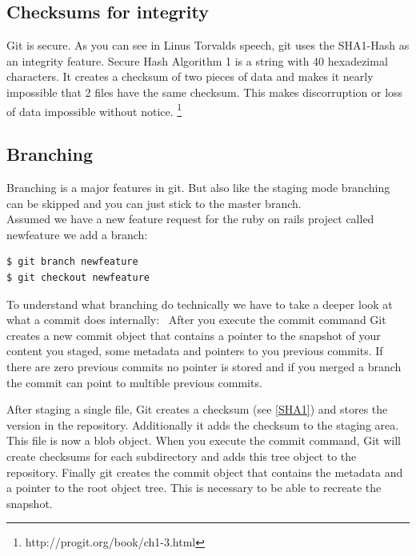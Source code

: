 \subsection{Checksums for integrity}

 \cite{googletechtalk2007}

Git is secure. As you can see in Linus Torvalds speech, git uses the SHA1-Hash
as an integrity feature. Secure Hash Algorithm 1 is a string with 40 hexadezimal
characters. It creates a checksum of two pieces of data and makes it nearly
impossible that 2 files have the same checksum. This makes discorruption or loss
of data impossible without notice. \footnote{ \cite{gitpro2009} http://progit.org/book/ch1-3.html }

\subsection {Branching}

Branching is a major features in git. But also like the staging mode
branching can be skipped and you can just stick to the master
branch. \\
Assumed we have a new feature request for the ruby on rails project called
newfeature we add a branch:
\begin{lstlisting}
$ git branch newfeature
$ git checkout newfeature
\end{lstlisting}

To understand what branching do technically we have to take a deeper look at
what a commit does internally: \
After you execute the commit command Git creates a new commit object that
contains a pointer to the snapshot of your content you staged, some metadata and
pointers to you previous commits. If there are zero previous commits no pointer
is stored and if you merged a branch the commit can point to multible previous commits.

After staging a single file, Git creates a checksum (see
\ref{SHA1}) and stores the version in the repository. Additionally it adds the
checksum to the staging area. This file is now a blob object.
When you execute the commit command, Git will create checksums for each
subdirectory and adds this tree object to the repository. Finally git creates
the commit object that contains the metadata and a pointer to the root object
tree. This is necessary to be able to recreate the snapshot.

